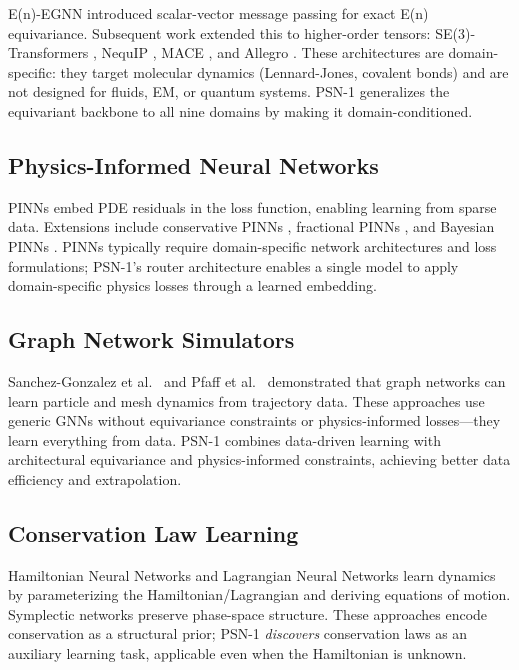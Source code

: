 \documentclass[11pt,a4paper]{article}
\begin{document}
E(n)-EGNN \cite{satorras2021egnn} introduced scalar-vector message passing for exact E(n) equivariance. Subsequent work extended this to higher-order tensors: SE(3)-Transformers \cite{fuchs2020se3}, NequIP \cite{batzner2022nequip}, MACE \cite{batatia2022mace}, and Allegro \cite{musaelian2023learning}. These architectures are domain-specific: they target molecular dynamics (Lennard-Jones, covalent bonds) and are not designed for fluids, EM, or quantum systems. PSN-1 generalizes the equivariant backbone to all nine domains by making it domain-conditioned.

\subsection{Physics-Informed Neural Networks}

PINNs \cite{raissi2019physics,lu2021deepxde} embed PDE residuals in the loss function, enabling learning from sparse data. Extensions include conservative PINNs \cite{jagtap2020conservative}, fractional PINNs \cite{pang2019fpinns}, and Bayesian PINNs \cite{yang2021bpinNs}. PINNs typically require domain-specific network architectures and loss formulations; PSN-1's router architecture enables a single model to apply domain-specific physics losses through a learned embedding.

\subsection{Graph Network Simulators}

Sanchez-Gonzalez et al.\ \cite{sanchez2020learning} and Pfaff et al.\ \cite{pfaff2021learning} demonstrated that graph networks can learn particle and mesh dynamics from trajectory data. These approaches use generic GNNs without equivariance constraints or physics-informed losses---they learn everything from data. PSN-1 combines data-driven learning with architectural equivariance and physics-informed constraints, achieving better data efficiency and extrapolation.

\subsection{Conservation Law Learning}

Hamiltonian Neural Networks \cite{greydanus2019hamiltonian} and Lagrangian Neural Networks \cite{cranmer2020lagrangian} learn dynamics by parameterizing the Hamiltonian/Lagrangian and deriving equations of motion. Symplectic networks \cite{jin2020sympnets,chen2020symplectic} preserve phase-space structure. These approaches encode conservation as a structural prior; PSN-1 \emph{discovers} conservation laws as an auxiliary learning task, applicable even when the Hamiltonian is unknown.
\end{document}
